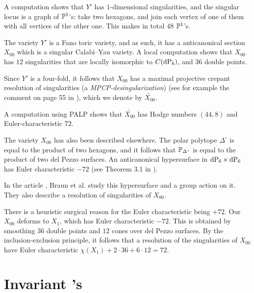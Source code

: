 A computation shows that $Y'$ has $1$-dimensional singularities, and the singular locus is a graph of $\P^1$'s: take two hexagons, and join each vertex of one of them with all vertices of the other one. This makes in total $48$ $\P^1$'s. 

The variety $Y'$ is a Fano toric variety, and as such, it has a anticanonical section $X_{00}$ which is a singular Calabi--Yau variety. A local computation shows that $X_{00}$ has $12$ singularities that are locally isomorphic to $C(\dP6)$, and $36$ double points.

Since $Y'$ is a four-fold, it follows that $X_{00}$ has a maximal projective crepant resolution of singularities (a \emph{MPCP-desingularization}) (see for example the comment on page 55 in \cite{mirrorsymmetry}), which we denote by $\widetilde{X_{00}}$.

A computation using PALP \cite{palp} shows that $\widetilde{X_{00}}$ has Hodge numbers $(44,8)$ and Euler-characteristic $72$. 

\begin{remark}
The variety $X_{00}$ has also been described elsewhere. The polar polytope $\Delta^{\circ}$ is equal to the product of two hexagons, and it follows that $\P_{\Delta^\circ}$ is equal to the product of two del Pezzo surfaces. An anticanonical hypersurface in $\dP6 \times \dP6$ has Euler characteristic $-72$ (see Theorem 3.1 in \cite{bestiary_hubsch}).

In the article \cite{braun_smallhodgenumbers}, Braun et al. study this hypersurface and a group action on it. They also describe a resolution of singularities of $X_{00}$.
\end{remark}

\begin{remark}
There is a heuristic surgical reason for the Euler characteristic being $+72$. Our $X_{00}$ deforms to $X_1$, which has Euler characteristic $-72$. This is obtained by smoothing $36$ double points and $12$ cones over del Pezzo surfaces. By the inclusion-exclusion principle, it follows that a resolution of the singularities of $X_{00}$ have Euler characteristic $\chi(X_1)+2\cdot 36 + 6 \cdot 12=72$.
\end{remark}



\section{Invariant \CY's}

